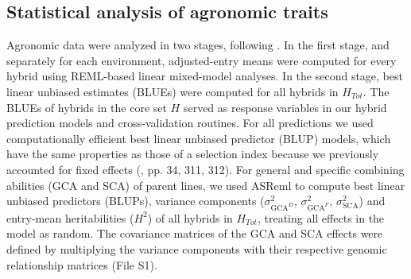 \documentclass[12pt,titlepage]{article}
\begin{document}
\subsection{Statistical analysis of agronomic traits}
Agronomic data were analyzed in two stages, following . 
In the first stage, and separately for each environment, adjusted-entry means 
were computed for every hybrid using REML-based linear mixed-model analyses.
In the second stage, best linear unbiased estimates (BLUEs) were computed for 
all hybrids in $H_{Tot}$.
The BLUEs of hybrids in the core set $H$ served as response variables in our 
hybrid prediction models and cross-validation routines. 
For all predictions we used computationally efficient best linear unbiased 
predictor (BLUP) models, which have the same properties as those of a selection 
index because we previously accounted for fixed effects 
(, pp. 34, 311, 312).
For general and specific combining abilities (GCA and SCA) of parent lines,
we used ASReml \cite{asreml} to compute best linear unbiased predictors (BLUPs), 
variance components ($\sigma^2_{\text{GCA}^{D}}$, $\sigma^2_{\text{GCA}^{F}}$, 
$\sigma^2_{\text{SCA}}$) and entry-mean heritabilities ($H^2$) of all hybrids
in $H_{Tot}$, treating all effects in the model as random.
The covariance matrices of the GCA and SCA effects were defined by multiplying
the variance components with their respective genomic relationship matrices 
(File S1). 
\end{document}
